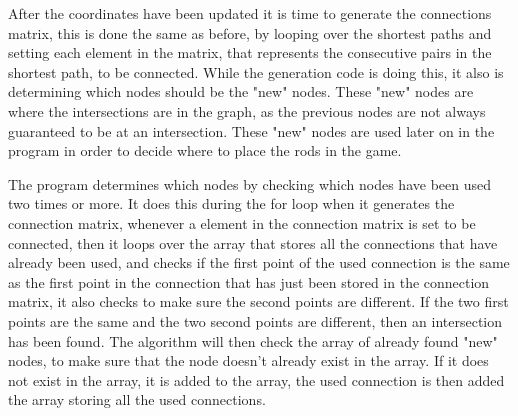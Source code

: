 
	After the coordinates have been updated it is time to generate the connections matrix, this is done the same as before, by looping over the shortest paths and setting each element in the matrix, that represents the consecutive pairs in the shortest path, to be connected. While the generation code is doing this, it also is determining which nodes should be the "new" nodes. These "new" nodes are where the intersections are in the graph, as the previous nodes are not always guaranteed to be at an intersection. These "new" nodes are used later on in the program in order to decide where to place the rods in the game.
	\newline
	\par
	The program determines which nodes by checking which nodes have been used two times or more. It does this during the for loop when it generates the connection matrix, whenever a element in the connection matrix is set to be connected, then it loops over the array that stores all the connections that have already been used, and checks if the first point of the used connection is the same as the first point in the connection that has just been stored in the connection matrix, it also checks to make sure the second points are different. If the two first points are the same and the two second points are different, then an intersection has been found. The algorithm will then check the array of already found "new" nodes, to make sure that the node doesn't already exist in the array. If it does not exist in the array, it is added to the array, the used connection is then added the array storing all the used connections.\\


